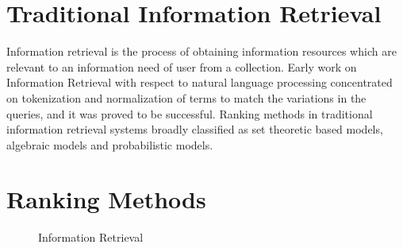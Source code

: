 

\section{Traditional Information Retrieval} 
Information retrieval is the process of obtaining information resources which are  relevant to an information need of user from a collection. Early work on Information Retrieval with respect to natural language processing concentrated on tokenization and normalization of terms to match the variations in the queries, and it was proved to be successful. Ranking methods in traditional information retrieval systems broadly classified as set theoretic based models, algebraic models and probabilistic models.






\section{Ranking Methods} \label{Ranking Methods}

\begin{figure}[h]
\begin{center}
\end{center}
\caption{Information Retrieval}
\end{figure}


